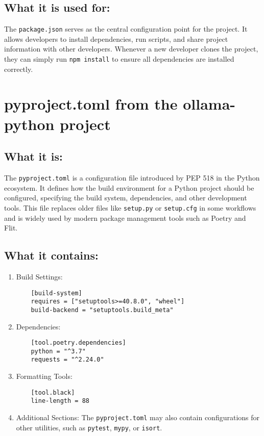 \documentclass{article}
\begin{document}
\subsection{What it is used for:}
The \texttt{package.json} serves as the central configuration point for the project. It allows developers to install dependencies, run scripts, and share project information with other developers. Whenever a new developer clones the project, they can simply run \texttt{npm install} to ensure all dependencies are installed correctly.

\section{pyproject.toml from the ollama-python project}

\subsection{What it is:}
The \texttt{pyproject.toml} is a configuration file introduced by PEP 518 in the Python ecosystem. It defines how the build environment for a Python project should be configured, specifying the build system, dependencies, and other development tools. This file replaces older files like \texttt{setup.py} or \texttt{setup.cfg} in some workflows and is widely used by modern package management tools such as Poetry and Flit.

\subsection{What it contains:}
\begin{enumerate}
    \item Build Settings:
    \begin{verbatim}
    [build-system]
    requires = ["setuptools>=40.8.0", "wheel"]
    build-backend = "setuptools.build_meta"
    \end{verbatim}
    \item Dependencies:
    \begin{verbatim}
    [tool.poetry.dependencies]
    python = "^3.7"
    requests = "^2.24.0"
    \end{verbatim}
    \item Formatting Tools:
    \begin{verbatim}
    [tool.black]
    line-length = 88
    \end{verbatim}
    \item Additional Sections: 
    The \texttt{pyproject.toml} may also contain configurations for other utilities, such as \texttt{pytest}, \texttt{mypy}, or \texttt{isort}.
\end{enumerate}
\end{document}
